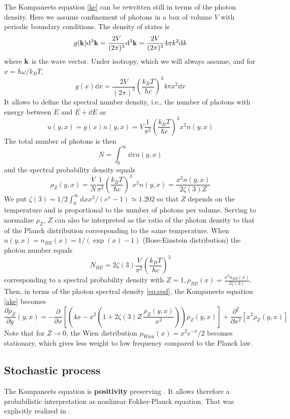 \documentclass[a4paper,12pt,reqno,superscriptaddress,nofootinbib]{article}
\theoremstyle{plain}
\theoremstyle{definition}
\theoremstyle{remark}
\newcommand{\id}{\textrm{d}}
\newcommand{\0}{^{(0)}}
\newcommand{\1}{^{(1)}}
\newcommand{\2}{^{(2)}}
\begin{document}
The Kompaneets equation \eqref{ke} can be rewritten still in terms of the photon density.  Here we assume confinement of photons in a box of volume $V$ with periodic boundary conditions.  The density of states is
\[
g(\vb{k}) \dd^3 \vb{k} = \frac{2V}{(2\pi)^3} \dd^3 \vb{k} = \frac{2V}{(2\pi)^3} 
4\pi k^2 \dd k
\]
where $\vb{k}$ is the wave vector.  Under isotropy, which we will always assume, and for $x = \hbar \omega / k_B T$,
\[
g(x) \dd x = \frac{2V}{(2\pi)^3} \left( \frac{k_B T}{\hbar c} \right)^3 4\pi 
x^2 \dd x
\] 
It allows to define the spectral number density, i.e., the number of photons with energy between $E$ and $E+\dd E$ as 
\begin{equation}\label{eq:snd}
u(y,x) = g(x) n(y,x) = V \frac{1}{\pi^2} \left( \frac{k_B T}{\hbar c} \right)^3 
x^2 n(y,x)
\end{equation}
The total number of photons is then
\[ N = \int_0^\infty \dd{x} u(y,x)
 \]
and the spectral probability density equals
\begin{equation}\label{eq:spd}
\rho_Z(y,x) = \frac{V}{N} \frac{1}{\pi^2} \left(\frac{k_B T}{\hbar c}\right)^3 
x^2 n(y,x) = \frac{x^2 n(y,x)}{2\zeta(3) Z}
\end{equation}
We put $\zeta(3) = 1/2 \int_0^\infty \id x x^2/(e^x-1) \simeq 1.202$
so that $Z$ depends on the temperature and is proportional 
to the number of photons per volume. Serving to normalize $\rho_Z$, $Z$ can also be interpreted as the ratio of the photon density to that 
of the Planck distribution corresponding to the same temperature.
 When $n(y,x)= n_{BE}(x) = 1 / (\exp(x) - 1)$ (Bose-Einstein distribution) the photon number 
equals
\[
N_{BE} = 2 \zeta(3) \frac{V}{\pi^2} \left( \frac{k_B T}{\hbar c} \right)^3
\]
corresponding to a spectral probability density with $Z = 1, \rho_{BE}(x) = \frac{x^2 n_{BE}(x)}{2\zeta(3)}$.\\
Then,  in terms of the photon spectral density \eqref{eq:spd}, the Kompaneets equation \eqref{ake} becomes
\begin{equation}\label{kp}
\frac{\partial \rho_Z}{\partial y} (y,x) = -\frac{\partial}{\partial x}\left[\left(4x- x^2\left(1+2\zeta(3) Z\,\frac{\rho_Z(y,x)}{x^2}\right)\right)\rho_Z(y,x)\right] + \frac{\partial^2}{\partial x^2}\left[x^2 \rho_Z(y,x)\right]
\end{equation}
Note that for 
$Z\rightarrow 0$, the Wien distribution $\rho_\text{Wien}(x) = x^2 e^{-x}/2$ becomes stationary, which gives less weight to low frequency compared to the Planck law.

\subsection{Stochastic process}
The Kompaneets equation is \textbf{positivity} preserving \cite{positivity}. It allows therefore a probabilistic interpretation as nonlinear Fokker-Planck equation. That was explicitly realized in \cite{fre}.\\
\end{document}
